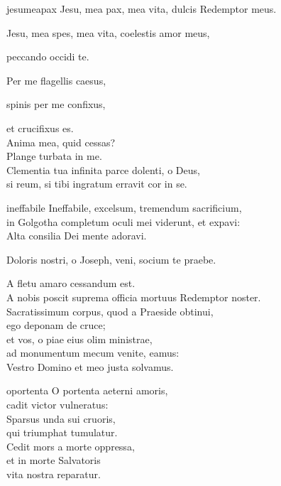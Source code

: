 \documentclass[tocstyle=ref-genre]{ees}
\begin{document}
{\clearpage
\begin{movement}{jesumeapax}
  \voice[M. Magdalena]
  Jesu, mea pax, mea vita, dulcis Redemptor meus.

  \voice[Petrus]
  Jesu, mea spes, mea vita, coelestis amor meus,

  \voice[both]
  peccando occidi te.

  \voice[Petrus]
  Per me flagellis caesus,

  \voice[M. Magdalena]
  spinis per me confixus,

  \voice[both]
  et crucifixus es.\\
  Anima mea, quid cessas?\\
  Plange turbata in me.\\
  Clementia tua infinita parce dolenti, o Deus,\\
  si reum, si tibi ingratum erravit cor in se.
\end{movement}

\begin{movement}{ineffabile}
  \voice[Joseph]
  Ineffabile, excelsum, tremendum sacrificium,\\
  in Golgotha completum oculi mei viderunt, et expavi:\\
  Alta consilia Dei mente adoravi.

  Doloris nostri, o Joseph, veni, socium te praebe.

  \voice[Joseph]
  A fletu amaro cessandum est.\\
  A nobis poscit suprema officia mortuus Redemptor noster.\\
  Sacratissimum corpus, quod a Praeside obtinui,\\
  ego deponam de cruce;\\
  et vos, o piae eius olim ministrae,\\
  ad monumentum mecum venite, eamus:\\
  Vestro Domino et meo justa solvamus.
\end{movement}

\begin{movement}{oportenta}
  \voice[Joseph]
  O portenta aeterni amoris,\\
  cadit victor vulneratus:\\
  Sparsus unda sui cruoris,\\
  qui triumphat tumulatur.\\
  Cedit mors a morte oppressa,\\
  et in morte Salvatoris\\
  vita nostra reparatur.
\end{movement}

}
\end{document}
